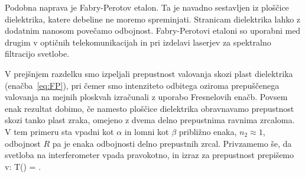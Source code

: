 Podobna naprava je Fabry-Perotov
etalon. Ta je navadno sestavljen iz ploščice dielektrika, katere debeline ne 
moremo spreminjati. Stranicam dielektrika lahko z dodatnim nanosom povečamo
odbojnost. Fabry-Perotovi etaloni so uporabni med drugim v optičnih 
telekomunikacijah in pri izdelavi laserjev za spektralno filtracijo svetlobe.

V prejšnjem razdelku smo izpeljali prepustnost valovanja skozi plast
dielektrika (enačba~\ref{eq:FP}), pri čemer smo intenziteto odbitega
oziroma prepuščenega valovanja na mejnih ploskvah izračunali z uporabo
Fresnelovih enačb. Povsem enak rezultat dobimo, če namesto ploščice 
dielektrika obravnavamo prepustnost skozi tanko plast zraka, omejeno
z dvema delno prepustnima ravnima zrcaloma. V tem primeru sta
vpadni kot $\alpha$ in lomni kot $\beta$  približno enaka, $n_2 \approx 1$,
odbojnost $R$ pa je enaka odbojnosti delno prepustnih zrcal. Privzamemo 
še, da svetloba na interferometer vpada pravokotno, in izraz za prepustnost
prepišemo v:
\beq
T(\omega) = .
\label{eq:06_44}
\eeq

